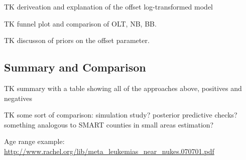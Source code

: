 TK deriveation and explanation of the offset log-transformed model

TK funnel plot and comparison of OLT, NB, BB.

TK discusson of priors on the offset parameter.

\subsection{Summary and Comparison}
TK summary with a table showing all of the approaches above, positives
and negatives

TK some sort of comparison: simulation study? posterior predictive
checks? something analogous to SMART counties in small areas
estimation?

Age range example:
\url{
http://www.rachel.org/lib/meta_leukemias_near_nukes.070701.pdf
}

